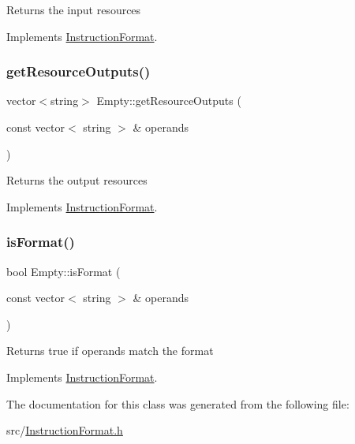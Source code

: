 Returns the input resources 

Implements \hyperlink{classInstructionFormat_a09775d3a3c22f40a0f44504664e586e4}{Instruction\+Format}.

\mbox{\label{classEmpty_a2952fa936d380f530b232bce35d337be}} 
\subsubsection{\texorpdfstring{get\+Resource\+Outputs()}{getResourceOutputs()}}
{\footnotesize\ttfamily vector$<$string$>$ Empty\+::get\+Resource\+Outputs (\begin{DoxyParamCaption}\item[{const vector$<$ string $>$ \&}]{operands }\end{DoxyParamCaption})\hspace{0.3cm}{\ttfamily [virtual]}}

Returns the output resources 

Implements \hyperlink{classInstructionFormat_a95cd28ffb1bde59b67f676880ab10536}{Instruction\+Format}.

\mbox{\label{classEmpty_a2fce1c7e9e73a489c8a79a4046ae45b0}} 
\subsubsection{\texorpdfstring{is\+Format()}{isFormat()}}
{\footnotesize\ttfamily bool Empty\+::is\+Format (\begin{DoxyParamCaption}\item[{const vector$<$ string $>$ \&}]{operands }\end{DoxyParamCaption})\hspace{0.3cm}{\ttfamily [virtual]}}

Returns true if operands match the format 

Implements \hyperlink{classInstructionFormat_a9fdcf94dcd7d9a55ba86e7a63f04d1fe}{Instruction\+Format}.



The documentation for this class was generated from the following file\+:\begin{DoxyCompactItemize}
\item 
src/\hyperlink{InstructionFormat_8h}{Instruction\+Format.\+h}\end{DoxyCompactItemize}
